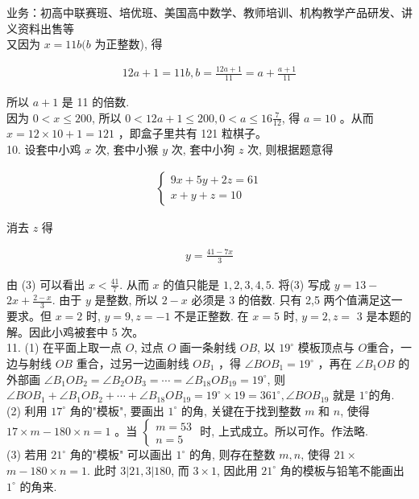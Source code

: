 \documentclass[10pt]{article}
\begin{document}
业务：初高中联赛班、培优班、美国高中数学、教师培训、机构教学产品研发、讲义资料出售等\\
又因为 $x=11 b(b$ 为正整数), 得

\begin{align*}
12 a+1=11 b, b=\frac{12 a+1}{11}=a+\frac{a+1}{11}
\end{align*}

所以 $a+1$ 是 11 的倍数.\\
因为 $0<x \leqslant 200$, 所以 $0<12 a+1 \leqslant 200,0<a \leqslant 16 \frac{7}{12}$, 得 $a=10$ 。从而 $x=12 \times 10+1=121$ ，即盒子里共有 121 粒棋子。\\
10. 设套中小鸡 $x$ 次, 套中小猴 $y$ 次, 套中小狗 $z$ 次, 则根据题意得

\begin{align*}
\left\{\begin{array}{l}
9 x+5 y+2 z=61  \tag{1}\\
x+y+z=10
\end{array}\right.
\end{align*}

消去 $z$ 得

\begin{align*}
y=\frac{41-7 x}{3} \tag{3}
\end{align*}

由 (3) 可以看出 $x<\frac{41}{7}$. 从而 $x$ 的值只能是 $1,2,3,4,5$. 将(3) 写成 $y=13-$ $2 x+\frac{2-x}{3}$. 由于 $y$ 是整数, 所以 $2-x$ 必须是 3 的倍数. 只有 2,5 两个值满足这一要求。但 $x=2$ 时, $y=9, z=-1$ 不是正整数. 在 $x=5$ 时, $y=2, z=$ 3 是本题的解。因此小鸡被套中 5 次。\\
11. (1) 在平面上取一点 $O$, 过点 $O$ 画一条射线 $O B$, 以 $19^{\circ}$ 模板顶点与 $O$重合，一边与射线 $O B$ 重合，过另一边画射线 $O B_{1}$ ，得 $\angle B O B_{1}=19^{\circ}$ ，再在 $\angle B_{1} O B$ 的外部画 $\angle B_{1} O B_{2}=\angle B_{2} O B_{3}=\cdots=\angle B_{18} O B_{19}=19^{\circ}$, 则 $\angle B O B_{1}+\angle B_{1} O B_{2}+\cdots+\angle B_{18} O B_{19}=19^{\circ} \times 19=361^{\circ}, \angle B O B_{19}$ 就是 $1^{\circ}$的角.\\
(2) 利用 $17^{\circ}$ 角的"模板", 要画出 $1^{\circ}$ 的角, 关键在于找到整数 $m$ 和 $n$, 使得 $17 \times m-180 \times n=1$ 。当 $\left\{\begin{array}{l}m=53 \\ n=5\end{array}\right.$ 时, 上式成立。所以可作。作法略.\\
(3) 若用 $21^{\circ}$ 角的"模板" 可以画出 $1^{\circ}$ 的角, 则存在整数 $m, n$, 使得 $21 \times$ $m-180 \times n=1$. 此时 $3|21,3| 180$, 而 $3 \times 1$, 因此用 $21^{\circ}$ 角的模板与铅笔不能画出 $1^{\circ}$ 的角来.
\end{document}
